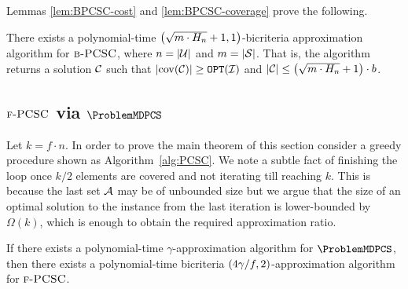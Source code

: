 Lemmas \ref{lem:BPCSC-cost} and \ref{lem:BPCSC-coverage} prove the following.
\begin{theorem} \label{thm:BPCSC}
    There exists a polynomial-time $\mathopen{}\left( \sqrt{m\cdot H_n}+1, 1 \right)$-bicriteria approximation algorithm for $\textup{\textsc{b-PCSC}}$, where $n=\mathopen{}\left| \mathcal{U} \right|$ and $m=\mathopen{}\left| \mathcal{S} \right|$. That is, the algorithm returns a solution $\mathcal{C}$ such that $\mathopen{}\left| \operatorname{cov}\mathopen{}\left( \mathcal{C} \right) \right|\geq \texttt{OPT}\mathopen{}\left( \mathcal{I} \right)$ and $\mathopen{}\left| \mathcal{C} \right|\leq \mathopen{}\left( \sqrt{m\cdot H_n}+1 \right)\cdot b$.
\end{theorem}

\subsection{$\textup{\textsc{f-PCSC}}$ via $\ProblemMDPCS$}\label{subsection:PCSC}
Let $k=f\cdot n$.
In order to prove the main theorem of this section consider a greedy procedure shown as Algorithm~\ref{alg:PCSC}.
We note a subtle fact of finishing the loop once $k/2$ elements are covered and not iterating till reaching $k$.
This is because the last set $\mathcal{A}$ may be of unbounded size but we argue that the size of an optimal solution to the instance from the last iteration is lower-bounded by $\Omega(k)$, which is enough to obtain the required approximation ratio.

\begin{theorem} \label{thm:MDPCStoPCSC}
    If there exists a polynomial-time $\gamma$-approximation algorithm for $\ProblemMDPCS$, then there exists a polynomial-time bicriteria $\mathopen{}\left( 4\gamma/f, 2 \right)$-approximation algorithm for $\textup{\textsc{f-PCSC}}$.
\end{theorem}
